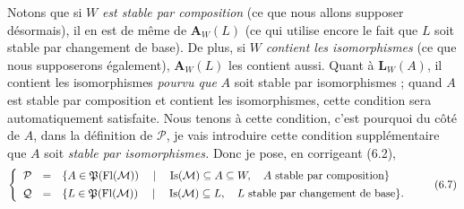 Notons que si $W$ \textit{est stable par composition} (ce que nous allons supposer désormais), il en est de même de $\mathbf{A}_W(L)$ (ce qui utilise encore le fait que $L$ soit stable par changement de base). De plus, si $W$ \textit{contient les isomorphismes} (ce que nous supposerons également), $\mathbf{A}_W(L)$ les contient aussi. Quant à $\mathbf{L}_W(A)$, il contient les isomorphismes \textit{pourvu que} $A$ soit stable par isomorphismes ; quand $A$ est stable par composition et contient les isomorphismes, cette condition sera automatiquement satisfaite. Nous tenons à cette condition, c'est pourquoi du côté de $A$, dans la définition de $\mathcal{P}$, je vais introduire cette condition supplémentaire que $A$ soit \textit{stable par isomorphismes.} Donc je pose, en corrigeant (6.2),
\[
\left\{
\begin{array}{rcl}
\mathcal{P} & = & \{A\in\mathfrak{P}(\mathrm{Fl}(\mathcal{M}))\quad\mid\quad\mathrm{Is}(\mathcal{M})\subseteq A\subseteq W,\quad A\text{ stable par composition}\}\\[1ex]
\mathcal{Q} & = & \{L\in\mathfrak{P}(\mathrm{Fl}(\mathcal{M}))\quad\mid\quad\mathrm{Is}(\mathcal{M})\subseteq L,\quad L\text{ stable par changement de base}\}.
\end{array}
\right.
\tag*{(6.7)}
\]

